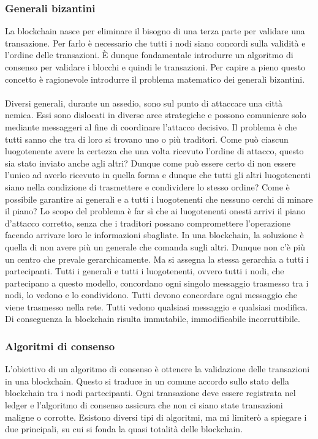 \subsubsection{Generali bizantini}
La blockchain nasce per eliminare il bisogno di una terza parte per validare una transazione. Per farlo è necessario che tutti i nodi siano concordi sulla validità e l’ordine delle transazioni. È dunque fondamentale introdurre un algoritmo di consenso per validare i blocchi e quindi le transazioni. Per capire a pieno questo concetto è ragionevole introdurre il problema matematico dei generali bizantini.\\\\
Diversi generali, durante un assedio, sono sul punto di attaccare una città nemica. Essi sono dislocati in diverse aree strategiche e possono comunicare solo mediante messaggeri al fine di coordinare l’attacco decisivo.
Il problema è che tutti sanno che tra di loro si trovano uno o più traditori. 
Come può ciascun luogotenente avere la certezza che una volta ricevuto l’ordine di attacco, questo sia stato inviato anche agli altri? Dunque come può essere certo di non essere l’unico ad averlo ricevuto in quella forma e dunque che tutti gli altri luogotenenti siano nella condizione di trasmettere e condividere lo stesso ordine?
Come è possibile garantire ai generali e a tutti i luogotenenti che nessuno cerchi di minare il piano?
Lo scopo del problema è far sì che ai luogotenenti onesti arrivi il piano d’attacco corretto, senza che i traditori possano compromettere l’operazione facendo arrivare loro le informazioni sbagliate.
In una blockchain, la soluzione è quella di non avere più un generale che comanda sugli altri. Dunque non c’è più un centro che prevale gerarchicamente. Ma si assegna la stessa gerarchia a tutti i partecipanti. Tutti i generali e tutti i luogotenenti, ovvero tutti i nodi, che partecipano a questo modello, concordano ogni singolo messaggio trasmesso tra i nodi, lo vedono e lo condividono. Tutti devono concordare ogni messaggio che viene trasmesso nella rete. Tutti vedono qualsiasi messaggio e qualsiasi modifica. Di conseguenza la blockchain risulta immutabile, immodificabile incorruttibile.


\subsubsection{Algoritmi di consenso}
L’obiettivo di un algoritmo di consenso è ottenere la validazione delle transazioni in una blockchain. Questo si traduce in un comune accordo sullo stato della blockchain tra i nodi partecipanti. Ogni transazione deve essere registrata nel ledger e l’algoritmo di consenso assicura che non ci siano state transazioni maligne o corrotte.
Esistono diversi tipi di algoritmi, ma mi limiterò a spiegare i due principali, su cui si fonda la quasi totalità delle blockchain.\\

